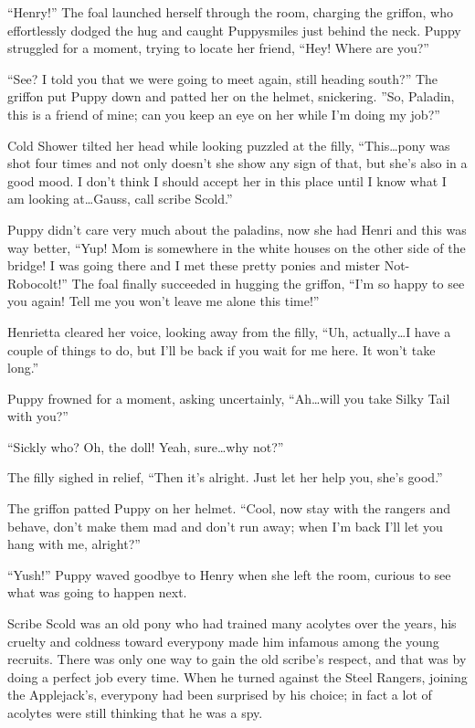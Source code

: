 ``Henry!'' The foal launched herself through the room, charging the griffon, who effortlessly dodged the hug and caught Puppysmiles just behind the neck. Puppy struggled for a moment, trying to locate her friend, ``Hey! Where are you?''

``See? I told you that we were going to meet again, still heading south?'' The griffon put Puppy down and patted her on the helmet, snickering. ''So, Paladin, this is a friend of mine; can you keep an eye on her while I'm doing my job?''

Cold Shower tilted her head while looking puzzled at the filly, ``This\dots pony was shot four times and not only doesn't she show any sign of that, but she's also in a good mood. I don't think I should accept her in this place until I know what I am looking at\dots Gauss, call scribe Scold.''

Puppy didn't care very much about the paladins, now she had Henri and this was way better, ``Yup! Mom is somewhere in the white houses on the other side of the bridge! I was going there and I met these pretty ponies and mister Not-Robocolt!'' The foal finally succeeded in hugging the griffon, ``I'm so happy to see you again! Tell me you won't leave me alone this time!''

Henrietta cleared her voice, looking away from the filly, ``Uh, actually\dots I have a couple of things to do, but I'll be back if you wait for me here. It won't take long.''

Puppy frowned for a moment, asking uncertainly, ``Ah\dots will you take Silky Tail with you?''

``Sickly who? Oh, the doll! Yeah, sure\dots why not?''

The filly sighed in relief, ``Then it's alright. Just let her help you, she's good.''

The griffon patted Puppy on her helmet. ``Cool, now stay with the rangers and behave, don't make them mad and don't run away; when I'm back I'll let you hang with me, alright?''

``Yush!'' Puppy waved goodbye to Henry when she left the room, curious to see what was going to happen next.

\horizonline


Scribe Scold was an old pony who had trained many acolytes over the years, his cruelty and coldness toward everypony made him infamous among the young recruits. There was only one way to gain the old scribe's respect, and that was by doing a perfect job every time. When he turned against the Steel Rangers, joining the Applejack's, everypony had been surprised by his choice; in fact a lot of acolytes were still thinking that he was a spy.

